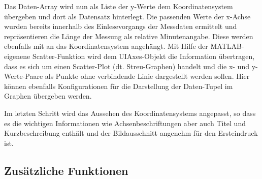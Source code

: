 Das Daten-Array wird nun als Liste der y-Werte dem Koordinatensystem übergeben und dort als Datensatz hinterlegt. Die passenden Werte der x-Achse wurden bereits innerhalb des Einlesevorgangs der Messdaten ermittelt und repräsentieren die Länge der Messung als relative Minutenangabe. Diese werden ebenfalls mit an das Koordinatensystem angehängt. Mit Hilfe der MATLAB-eigenene Scatter-Funktion wird dem UIAxes-Objekt die Information übertragen, dass es sich um einen Scatter-Plot (dt. Streu-Graphen) handelt und die x- und y-Werte-Paare als Punkte ohne verbindende Linie dargestellt werden sollen. Hier können ebenfalls Konfigurationen für die Darstellung der Daten-Tupel im Graphen übergeben werden.



Im letzten Schritt wird das Aussehen des Koordinatensystems angepasst, so dass es die wichtigen Informationen wie Achsenbeschriftungen aber auch Titel und Kurzbeschreibung enthält und der Bildausschnitt angenehm für den Ersteindruck ist.

\subsection{Zusätzliche Funktionen}

